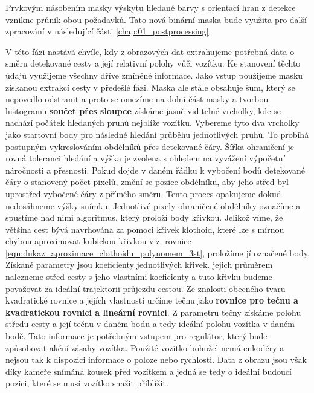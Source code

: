 \documentclass[czech, bc, kky, he, iso690alph]{fasthesis}
\begin{document}
            	Prvkovým násobením masky výskytu hledané barvy s orientací hran z detekce vznikne průnik obou požadavků. Tato nová binární maska bude využita pro další zpracování v následující části \ref{chap:01_postprocessing}.
            	
            	
                V této fázi nastává chvíle, kdy z obrazových dat extrahujeme potřebná data o směru detekované cesty a její relativní polohy vůči vozítku. Ke stanovení těchto údajů využijeme všechny dříve zmíněné informace. Jako vstup použijeme masku získanou extrakcí cesty v předešlé fázi. Maska ale stále obsahuje šum, který se nepovedlo odstranit a proto se omezíme na dolní část masky a tvorbou histogramu \textbf{součet přes sloupce} získáme jasně viditelné vrcholky, kde se nachází počátek hledaných pruhů nejblíže vozítku. Vybereme tyto dva vrcholky jako startovní body pro následné hledání průběhu jednotlivých pruhů. To probíhá postupným vykreslováním obdélníků přes detekované čáry. Šířka ohraničení je rovná toleranci hledání a výška je zvolena s ohledem na vyvážení výpočetní náročnosti a přesnosti. Pokud dojde v daném řádku k vybočení bodů detekované čáry o stanovený počet pixelů, změní se pozice obdélníku, aby jeho střed byl uprostřed vybočené čáry z přímého směru. Tento proces opakujeme dokud nedosáhneme výšky snímku. Jednotlivé pixely ohraničené obdélníky označíme a spustíme nad nimi algoritmus, který proloží body křivkou. Jelikož víme, že většina cest bývá navrhována za pomoci křivek klothoid, které lze s mírnou chybou aproximovat kubickou křivkou viz. rovnice \ref{eqn:dukaz_aproximace_clothoidu_polynomem_3st}, proložíme jí označené body. Získané parametry jsou koeficienty jednotlivých křivek. jejich průměrem nalezneme střed cesty s jeho vlastními koeficienty a tuto křivku budeme považovat za ideální trajektorii průjezdu cestou. Ze znalosti obecného tvaru kvadratické rovnice a jejích vlastností určíme tečnu jako \textbf{rovnice pro tečnu a kvadratickou rovnici a lineární rovnici}. Z parametrů tečny získáme polohu středu cesty a její tečnu v daném bodu a tedy ideální polohu vozítka v daném bodě. Tato informace je potřebným vstupem pro regulátor, který bude způsobovat akční zásahy vozítka. Použité vozítko bohužel nemá enkodéry a nejsou tak k dispozici informace o poloze nebo rychlosti. Data z obrazu jsou však díky kameře snímána kousek před vozítkem a jedná se tedy o ideální budoucí pozici, které se musí vozítko snažit přiblížit.
\end{document}
